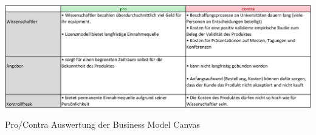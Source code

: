\documentclass[10pt, a4paper, oneside, titlepage]{scrartcl} %
\begin{document}
\begin{landscape}
   	\begin{table}[h!]
		\begin{center}
			\includegraphics[width=1.1\textwidth]{business_canvas_4_pro_contra.png}
		\end{center}
		\caption[Business Model Canvas - Pro/Contra Auswertung]{Pro/Contra Auswertung der Business Model Canvas}
		\label{fig:business_model_2}
	\end{table}
	\end{landscape}
	

\label{letzte_seite} %
\end{document}
